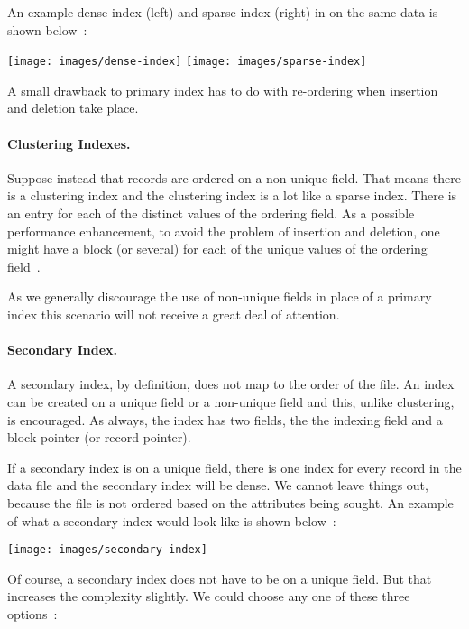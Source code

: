 \documentclass[a4paper]{report}
\begin{document}
An example dense index (left) and sparse index (right) in on the same data is shown below~\cite{fds}:

\begin{center}
\texttt{[image: images/dense-index]}
\texttt{[image: images/sparse-index]}
\end{center}


A small drawback to primary index has to do with re-ordering when insertion and deletion take place. 

\paragraph{Clustering Indexes.}
Suppose instead that records are ordered on a non-unique field. That means there is a clustering index and the clustering index is a lot like a sparse index. There is an entry for each of the distinct values of the ordering field. As a possible performance enhancement, to avoid the problem of insertion and deletion, one might have a block (or several) for each of the unique values of the ordering field~\cite{fds}.

As we generally discourage the use of non-unique fields in place of a primary index this scenario will not receive a great deal of attention.

\paragraph{Secondary Index.}

A secondary index, by definition, does not map to the order of the file. An index can be created on a unique field or a non-unique field and this, unlike clustering, is encouraged. As always, the index has two fields, the the indexing field and a block pointer (or record pointer). 

If a secondary index is on a unique field, there is one index for every record in the data file and the secondary index will be dense. We cannot leave things out, because the file is not ordered based on the attributes being sought. An example of what a secondary index would look like is shown below~\cite{fds}:

\begin{center}
\texttt{[image: images/secondary-index]}
\end{center}

Of course, a secondary index does not have to be on a unique field. But that increases the complexity slightly. We could choose any one of these three options~\cite{fds}:
\end{document}
